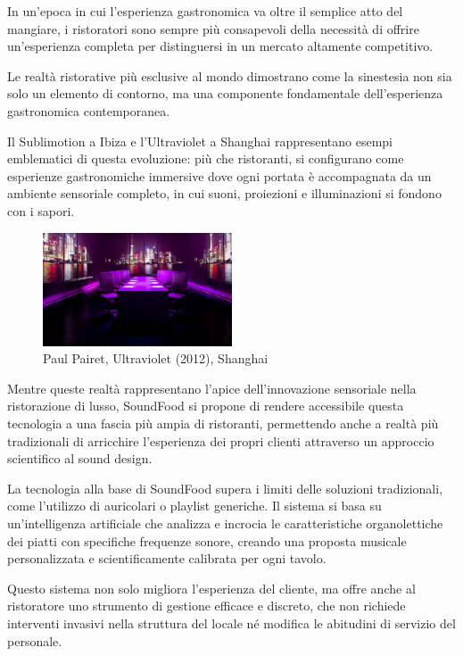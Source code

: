 In un'epoca in cui l'esperienza gastronomica va oltre il semplice atto del mangiare, i ristoratori sono sempre più consapevoli della necessità di offrire un'esperienza completa per distinguersi in un mercato altamente competitivo.

Le realtà ristorative più esclusive al mondo dimostrano come la sinestesia non sia solo un elemento di contorno, ma una componente fondamentale dell'esperienza gastronomica contemporanea.

Il Sublimotion a Ibiza e l'Ultraviolet a Shanghai rappresentano esempi emblematici di questa evoluzione: più che ristoranti, si configurano come esperienze gastronomiche immersive dove ogni portata è accompagnata da un ambiente sensoriale completo, in cui suoni, proiezioni e illuminazioni si fondono con i sapori.


\begin{figure}[H]
    \centering
    \includegraphics[width=0.5\textwidth]{Chapters/Figures/ultraviolet_shangai.jpg}
    \caption{\small Paul Pairet, Ultraviolet (2012), Shanghai}
    \label{fig:Ultraviolet}
\end{figure}

Mentre queste realtà rappresentano l'apice dell'innovazione sensoriale nella ristorazione di lusso, SoundFood si propone di rendere accessibile questa tecnologia a una fascia più ampia di ristoranti, permettendo anche a realtà più tradizionali di arricchire l'esperienza dei propri clienti attraverso un approccio scientifico al sound design.

La tecnologia alla base di SoundFood supera i limiti delle soluzioni tradizionali, come l'utilizzo di auricolari o playlist generiche. Il sistema si basa su un'intelligenza artificiale che analizza e incrocia le caratteristiche organolettiche dei piatti con specifiche frequenze sonore, creando una proposta musicale personalizzata e scientificamente calibrata per ogni tavolo.

Questo sistema non solo migliora l'esperienza del cliente, ma offre anche al ristoratore uno strumento di gestione efficace e discreto, che non richiede interventi invasivi nella struttura del locale né modifica le abitudini di servizio del personale.